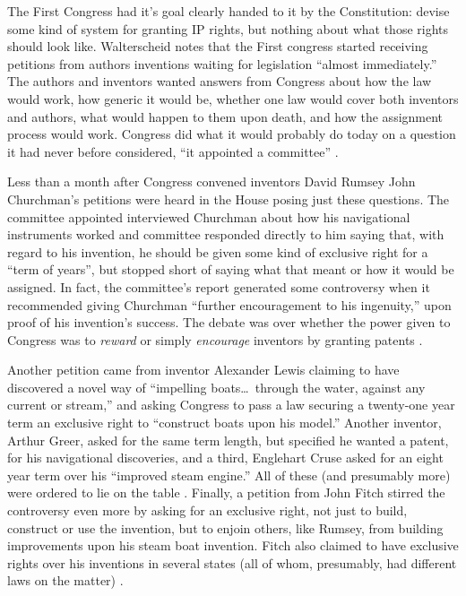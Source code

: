 \documentclass[pdftex,11pt,letterpaper]{article}
\begin{document}
The First Congress had it's goal clearly handed to it by the Constitution: devise some kind of system for granting IP rights, but nothing about what those rights should look like. Walterscheid notes that the First congress started receiving petitions from authors inventions waiting for legislation ``almost immediately.'' The authors and inventors wanted answers from Congress about how the law would work, how generic it would be, whether one law would cover both inventors and authors, what would happen to them upon death, and how the assignment process would work. Congress did what it would probably do today on a question it had never before considered, ``it appointed a committee'' \autocite[458]{Walterschied1997}. 

Less than a month after Congress convened inventors David Rumsey John Churchman's petitions were heard in the House posing just these questions. The committee appointed interviewed Churchman about how his navigational instruments worked and committee responded directly to him saying that, with regard to his invention, he should be given some kind of exclusive right for a ``term of years'', but stopped short of saying what that meant or how it would be assigned. In fact, the committee's report generated some controversy when it recommended giving Churchman ``further encouragement to his ingenuity,'' upon proof of his invention's success. The debate was over whether the power given to Congress was to \emph{reward} or simply \emph{encourage} inventors by granting patents \autocite[456-459]{Walterscheid1997}.

Another petition came from inventor Alexander Lewis claiming to have discovered a novel way of ``impelling boats\ldots~through the water, against any current or stream,'' and asking Congress to pass a law securing a twenty-one year term an exclusive right to ``construct boats upon his model.'' Another inventor, Arthur Greer, asked for the same term length, but specified he wanted a patent, for his navigational discoveries, and a third, Englehart Cruse asked for an eight year term over his ``improved steam engine.'' All of these (and presumably more) were ordered to lie on the table \autocite[459]{Walterscheid1997}. Finally, a petition from John Fitch stirred the controversy even more by asking for an exclusive right, not just to build, construct or use the invention, but to enjoin others, like Rumsey, from building improvements upon his steam boat invention. Fitch also claimed to have exclusive rights over his inventions in several states (all of whom, presumably, had different laws on the matter) \autocite[460-462]{Walterscheid1997}. 
\end{document}
